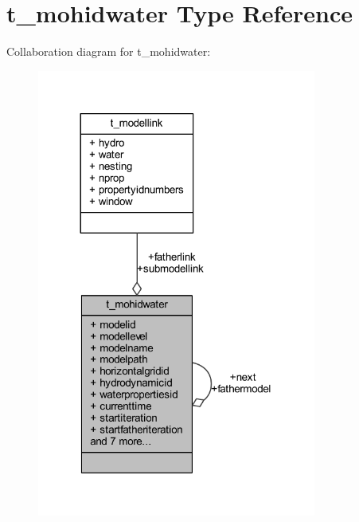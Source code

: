 \hypertarget{structt__mohidwater}{}\section{t\+\_\+mohidwater Type Reference}
\label{structt__mohidwater}


Collaboration diagram for t\+\_\+mohidwater\+:\nopagebreak
\begin{figure}[H]
\begin{center}
\leavevmode
\includegraphics[width=260pt]{structt__mohidwater__coll__graph}
\end{center}
\end{figure}
